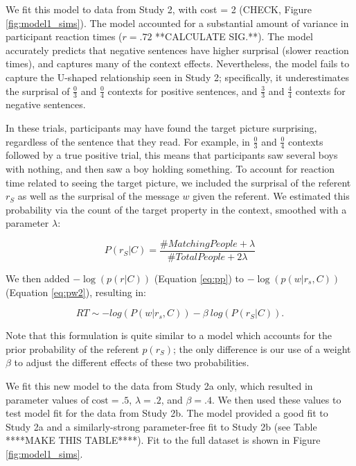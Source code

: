 \documentclass[10pt,letterpaper]{article}
\begin{document}
We fit this model to data from Study 2, with cost = 2 (CHECK, Figure \ref{fig:model1_sims}). The model accounted for a substantial amount of variance in participant reaction times ($r=.72$ **CALCULATE SIG.**).  The model accurately predicts that negative sentences have higher surprisal (slower reaction times), and captures many of the context effects.  Nevertheless, the model fails to capture the U-shaped relationship seen in Study 2; specifically, it underestimates the surprisal of $\frac{0}{3}$ and $\frac{0}{4}$ contexts for positive sentences, and $\frac{3}{3}$ and $\frac{4}{4}$ contexts for negative sentences.

In these trials, participants may have found the target picture surprising, regardless of the sentence that they read. For example, in $\frac{0}{3}$ and $\frac{0}{4}$ contexts followed by a true positive trial, this means that participants saw several boys with nothing, and then saw a boy holding something.  To account for reaction time related to seeing the target picture, we included the surprisal of the referent $r_S$ as well as the surprisal of the message $w$ given the referent. We estimated this probability via the count of the target property in the context, smoothed with a parameter $\lambda$:

\begin{equation}\label{eq:pp}
P(r_S | C) =  \frac{\# Matching People  + \lambda}{\# Total People + 2\lambda}
\end{equation}

We then added $-\log(p(r|C))$ (Equation \ref{eq:pp}) to $-\log(p(w|r_s,C))$ (Equation \ref{eq:pw2}), resulting in:

\begin{equation}\label{eq:total}
RT \sim - log(P(w|r_s, C)) - \beta ~ log(P(r_S|C)).
\end{equation}

\noindent Note that this formulation is quite similar to a model which accounts for the prior probability of the referent $p(r_S)$; the only difference is our use of a weight $\beta$ to adjust the different effects of these two probabilities.  

We fit this new model to the data from Study 2a only, which resulted in parameter values of $\text{cost} = .5$, $\lambda=.2$, and $\beta=.4$.  We then used these values to test model fit for the data from Study 2b.  The model provided a good fit to Study 2a and a similarly-strong parameter-free fit to Study 2b (see Table ****MAKE THIS TABLE****).  Fit to the full dataset is shown in Figure \ref{fig:model1_sims}.
\end{document}
